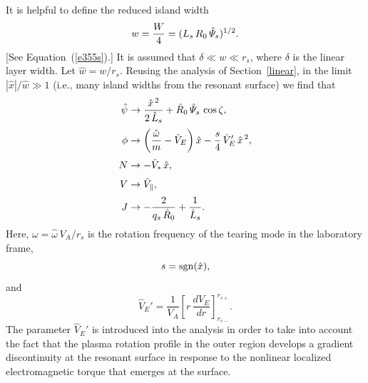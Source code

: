 \documentclass[notitlepage,12pt]{article}
\begin{document}
It is helpful to define the reduced island width
\begin{equation}\label{e456}
w = \frac{W}{4} = (L_s\,R_0\,\hat{\mit\Psi}_s)^{1/2}.
\end{equation}
[See Equation~(\ref{e355s}).]
It is assumed that $\delta\ll w\ll r_s$, where $\delta$ is the linear layer width. Let $\hat{w}= w/r_s$.  Reusing the analysis of Section~\ref{linear},
in the limit $|\hat{x}|/\hat{w}\gg 1$ (i.e., many island widths from the resonant surface) we find that 
\begin{align}
\hat{\psi} &\rightarrow \frac{\hat{x}^{\,2}}{2\,\hat{L}_s} + \hat{R}_0\,\hat{\mit\Psi}_s\,\cos\zeta,\\[0.5ex]
\phi &\rightarrow \left(\frac{\hat{\omega}}{m}- \hat{V}_E\right)\hat{x} - \frac{s}{4}\,\hat{V}_E'\,\hat{x}^{\,2},\\[0.5ex]
N &\rightarrow -\hat{V}_\ast\,\hat{x},\\[0.5ex]
V&\rightarrow \hat{V}_\parallel,\\[0.5ex]
J& \rightarrow -\frac{2}{q_s\,\hat{R}_0} + \frac{1}{\hat{L}_s}.
\end{align}
Here, $\omega = \hat{\omega}\,V_A/r_s$ is the rotation frequency of the tearing mode  in the
laboratory frame,
\begin{equation}
s = {\rm sgn}(\hat{x}),
\end{equation}
and 
\begin{equation}
\hat{V}_E' = \frac{1}{V_A}\left[r\,\frac{dV_E}{dr}\right]_{r_{s-}}^{r_{s+}}.
\end{equation}
The parameter $\hat{V}_E'$ is introduced  into the analysis in order to take into account the fact that the plasma rotation profile in the outer region develops a
gradient discontinuity at the resonant surface in response to the nonlinear localized electromagnetic torque that emerges 
at the surface. 
\end{document}
